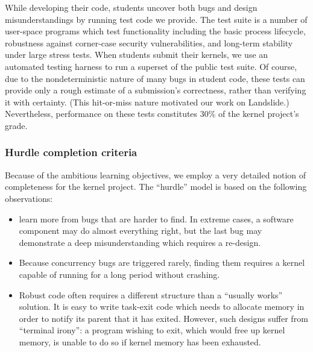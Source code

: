 While developing their code, students uncover both bugs
and design misunderstandings by running test code we
provide.
The test suite is a number of user-space programs which test
functionality
including the basic process lifecycle, robustness
against corner-case security vulnerabilities, and long-term stability
under large stress tests.
%
When students submit their kernels,
we use an automated testing harness to
run a superset of the public test suite.
%
Of course, due to the nondeterministic nature of many bugs in student code,
these tests can provide only a rough estimate of a submission's correctness,
rather than verifying it with certainty.
(This hit-or-miss nature motivated our work on Landslide.)
Nevertheless, performance on these tests constitutes 30\% of the kernel project's grade.

\subsubsection{Hurdle completion criteria}

Because of the ambitious learning objectives,
we employ a very detailed notion of completeness
for the kernel project.
The ``hurdle'' model is based on the following observations:

\begin{itemize}

\item {} learn more from bugs
that are harder to find.
In extreme cases, a software component may do
almost everything right, but the last bug may
demonstrate a deep misunderstanding which requires a re-design.

\item Because concurrency bugs are triggered rarely,
finding them requires a kernel capable of running
for a long period without crashing.

\item Robust code often requires a different structure
than a ``usually works'' solution.
It is easy to write task-exit code which
needs to allocate memory in order to notify its
parent that it has exited.
However, such designs suffer from ``terminal irony'':
a program wishing to exit,
which would free up kernel memory,
is unable to do so if kernel memory has been exhausted.

\end{itemize}

